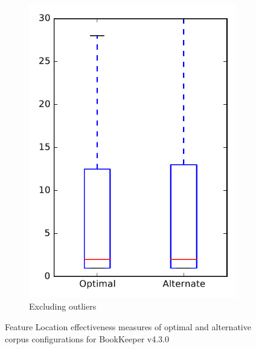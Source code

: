\begin{figure}
\begin{subfigure}{.4\textwidth}
        \includegraphics[height=0.4\textheight]{figures/combo/flt_rq2_bookkeeper_no_outlier}
        \caption{Excluding outliers}\label{fig:combo:flt:rq2:bookkeeper_no_outlier}
    \end{subfigure}
\caption{Feature Location effectiveness measures of optimal and alternative corpus configurations for BookKeeper v4.3.0}
\label{fig:combo:flt:rq2:bookkeeper}
\end{figure}
